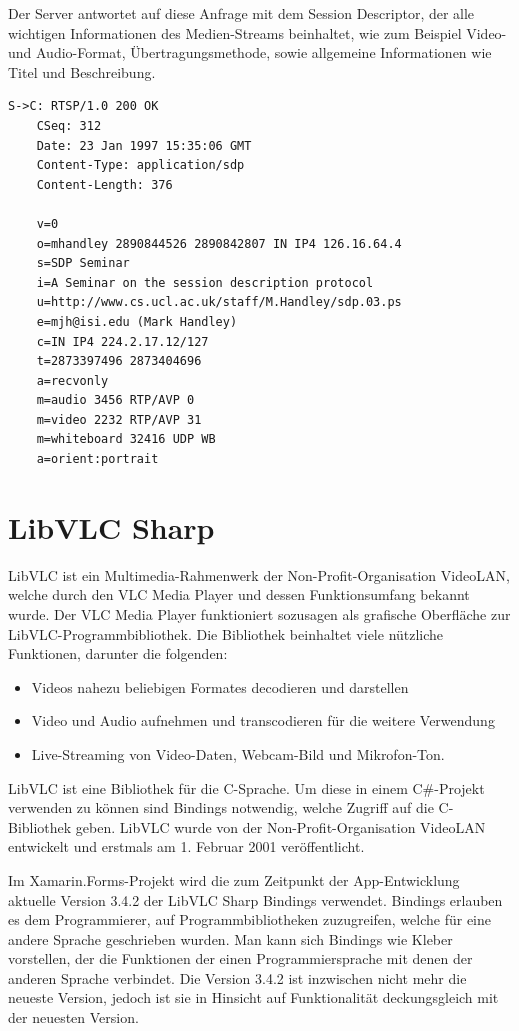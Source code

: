Der Server antwortet auf diese Anfrage mit dem Session Descriptor, der alle wichtigen Informationen des Medien-Streams beinhaltet, wie zum Beispiel Video- und Audio-Format, Übertragungsmethode, sowie allgemeine Informationen wie Titel und Beschreibung.
\begin{verbatim}
S->C: RTSP/1.0 200 OK
    CSeq: 312
    Date: 23 Jan 1997 15:35:06 GMT
    Content-Type: application/sdp
    Content-Length: 376

    v=0
    o=mhandley 2890844526 2890842807 IN IP4 126.16.64.4
    s=SDP Seminar
    i=A Seminar on the session description protocol
    u=http://www.cs.ucl.ac.uk/staff/M.Handley/sdp.03.ps
    e=mjh@isi.edu (Mark Handley)
    c=IN IP4 224.2.17.12/127
    t=2873397496 2873404696
    a=recvonly
    m=audio 3456 RTP/AVP 0
    m=video 2232 RTP/AVP 31
    m=whiteboard 32416 UDP WB
    a=orient:portrait
\end{verbatim}

\section{LibVLC Sharp}
LibVLC ist ein Multimedia-Rahmenwerk der Non-Profit-Organisation VideoLAN, welche durch den VLC Media Player und dessen Funktionsumfang bekannt wurde. Der VLC Media Player funktioniert sozusagen als grafische Oberfläche zur LibVLC-Programmbibliothek.
Die Bibliothek beinhaltet viele nützliche Funktionen, darunter die folgenden:
\begin{itemize}
    \item Videos nahezu beliebigen Formates decodieren und darstellen
    \item Video und Audio aufnehmen und transcodieren für die weitere Verwendung
    \item Live-Streaming von Video-Daten, Webcam-Bild und Mikrofon-Ton.
\end{itemize}    
LibVLC ist eine Bibliothek für die C-Sprache. Um diese in einem C\#-Projekt verwenden zu können sind Bindings notwendig, welche Zugriff auf die C-Bibliothek geben.
LibVLC wurde von der Non-Profit-Organisation VideoLAN entwickelt und erstmals am 1. Februar 2001 veröffentlicht. \cite[vgl.][]{libvlc-release}\par

Im Xamarin.Forms-Projekt wird die zum Zeitpunkt der App-Entwicklung aktuelle Version 3.4.2 der LibVLC Sharp Bindings verwendet. Bindings erlauben es dem Programmierer, auf Programmbibliotheken zuzugreifen, welche für eine andere Sprache geschrieben wurden. Man kann sich Bindings wie Kleber vorstellen, der die Funktionen der einen Programmiersprache mit denen der anderen Sprache verbindet. Die Version 3.4.2 ist inzwischen nicht mehr die neueste Version, jedoch ist sie in Hinsicht auf Funktionalität deckungsgleich mit der neuesten Version.\par

